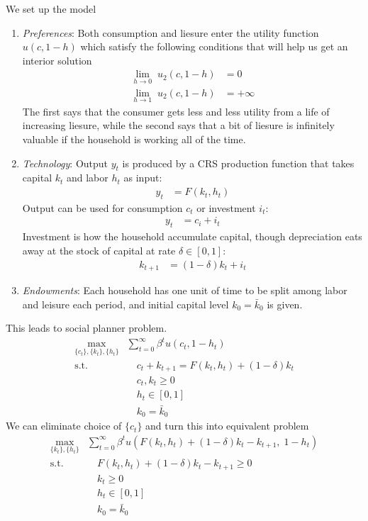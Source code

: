 \documentclass[12pt]{article}
\theoremstyle{plain}
\theoremstyle{definition}
\theoremstyle{remark}
\newcommand{\ra}{\rightarrow}
\newcommand{\sumtinfz}{\sum^\infty_{t=0}}
\begin{document}
We set up the model
\begin{enumerate}
  \item \emph{Preferences}: Both consumption and liesure enter the
    utility function $u(c,1-h)$ which satisfy the following conditions
    that will help us get an interior solution
    \begin{align*}
      \lim_{h\ra 0} \; u_2(c,1-h) &= 0 \\
      \lim_{h\ra 1} \; u_2(c,1-h) &= +\infty
    \end{align*}
    The first says that the consumer gets less and less utility from a
    life of increasing liesure, while the second says that a bit of
    liesure is infinitely valuable if the household is working all of
    the time.

  \item \emph{Technology}: Output $y_t$ is produced by a CRS production
    function that takes capital $k_t$ and labor $h_t$ as input:
    \begin{align*}
      y_t &= F(k_t,h_t)
    \end{align*}
    Output can be used for consumption $c_t$ or investment $i_t$:
    \begin{align*}
      y_t &= c_i + i_t
    \end{align*}
    Investment is how the household accumulate capital, though
    depreciation eats away at the stock of capital at rate
    $\delta\in[0,1]$:
    \begin{align*}
      k_{t+1} &= (1-\delta)k_t + i_t
    \end{align*}

  \item \emph{Endowments}: Each household has one unit of time to be
    split among labor and leisure each period, and initial capital level
    $k_0=\bar{k}_0$ is given.
\end{enumerate}
This leads to social planner problem.
\begin{align*}
  \max_{\{c_t\},\{k_t\},\{h_t\}}
    &\sumtinfz \beta^t u(c_t,1-h_t) \\
    \text{s.t.} &\quad
    c_t + k_{t+1}
    = F(k_t,h_t) + (1-\delta) k_t\\
    &\quad c_t, k_t \geq 0 \\
    &\quad h_t \in[0,1] \\
    &\quad k_0 = \bar{k}_0
\end{align*}
We can eliminate choice of $\{c_t\}$ and turn this into equivalent
problem
\begin{align*}
  \max_{\{k_t\},\{h_t\}}
    &\sumtinfz \beta^t
      u\left(F(k_t,h_t) + (1-\delta) k_t - k_{t+1}, \; 1-h_t\right) \\
    \text{s.t.} &\quad
    F(k_t,h_t) + (1-\delta) k_t - k_{t+1} \geq 0 \\
    & \quad k_t \geq 0 \\
    &\quad h_t \in[0,1] \\
    &\quad k_0 = \bar{k}_0
\end{align*}
\end{document}
